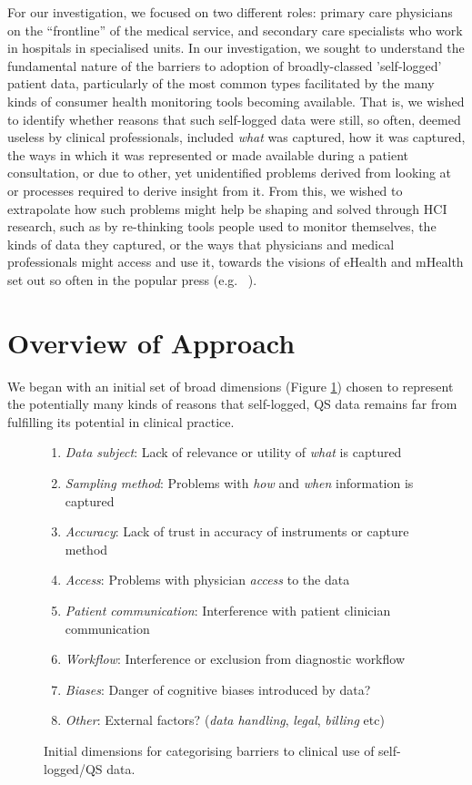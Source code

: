\documentclass{sigchi}
\begin{document}
For our investigation, we focused on two different roles: primary care physicians on the ``frontline'' of the medical service, and secondary care specialists who work in hospitals in specialised units.  In our investigation, we sought to understand the fundamental nature of the barriers to adoption of broadly-classed 'self-logged' patient data, particularly of the most common types facilitated by the many kinds of consumer health monitoring tools becoming available.  That is, we wished to identify whether reasons that such self-logged data were still, so often, deemed useless by clinical professionals, included \emph{what} was captured, how it was captured, the ways in which it was represented or made available during a patient consultation, or  due to other, yet unidentified problems derived from looking at or processes required to derive insight from it.  From this, we wished to extrapolate how such problems might help be shaping and solved through HCI research, such as by re-thinking tools people used to monitor themselves, the kinds of data they captured, or the ways that physicians and medical professionals might access and use it, towards the visions of eHealth and mHealth set out so often in the popular press (e.g. ~\cite{goetz, thingy, thingy}).

\section{Overview of Approach}

We began with an initial set of broad dimensions (Figure \ref{fig:qs}) chosen to represent the potentially many kinds of reasons that self-logged, QS data remains far from fulfilling its potential in clinical practice.

\begin{figure}[tbpb]
\begin{enumerate}
    \item \emph{Data subject}: Lack of relevance or utility of \emph{what} is captured
    \item \emph{Sampling method}: Problems with \emph{how} and \emph{when} information is captured
    \item \emph{Accuracy}: Lack of trust in accuracy of instruments or capture method
    \item \emph{Access}: Problems with physician \emph{access} to the data
    \item \emph{Patient communication}: Interference with patient clinician communication
    \item \emph{Workflow}: Interference or exclusion from diagnostic workflow
    \item \emph{Biases}: Danger of cognitive biases introduced by data?
    \item \emph{Other}: External factors? (\emph{data handling}, \emph{legal}, \emph{billing} etc)
\end{enumerate}
\caption{Initial dimensions for categorising barriers to clinical use of self-logged/QS data.}
\label{fig:qs}
\end{figure}
\end{document}
